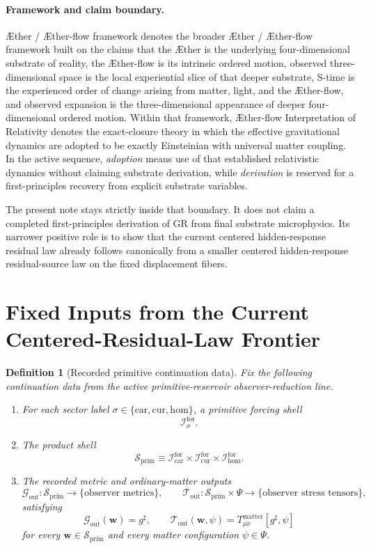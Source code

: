 \documentclass[11pt]{article}
\newcommand{\Aether}{\AE{}ther}
\newcommand{\Aflow}{\AE{}ther-flow}
\newcommand{\TheoryName}{\Aflow{} Interpretation of Relativity}
\newcommand{\TheoryProgram}{\Aether{} / \Aflow{} framework}
\newcommand{\CompletedMetric}{g^{\sharp}}
\newcommand{\MatterSpace}{\Psi}
\newcommand{\Car}{\mathrm{car}}
\newcommand{\Cur}{\mathrm{cur}}
\newcommand{\Hom}{\mathrm{hom}}
\newcommand{\ForSpace}[1]{\mathcal I_{#1}^{\mathrm{for}}}
\newcommand{\PrimShell}{\mathcal S_{\mathrm{prim}}}
\newcommand{\MetricOut}{\mathscr G_{\mathrm{out}}}
\newcommand{\MatterOut}{\mathscr T_{\mathrm{out}}}
\newtheorem{definition}{Definition}
\begin{document}
\paragraph{Framework and claim boundary.}
\TheoryProgram{} denotes the broader \Aether{} / \Aflow{} framework built on the claims that the \Aether{} is the underlying four-dimensional substrate of reality, the \Aflow{} is its intrinsic ordered motion, observed three-dimensional space is the local experiential slice of that deeper substrate, S-time is the experienced order of change arising from matter, light, and the \Aflow{}, and observed expansion is the three-dimensional appearance of deeper four-dimensional ordered motion. Within that framework, \TheoryName{} denotes the exact-closure theory in which the effective gravitational dynamics are adopted to be exactly Einsteinian with universal matter coupling. In the active sequence, \emph{adoption} means use of that established relativistic dynamics without claiming substrate derivation, while \emph{derivation} is reserved for a first-principles recovery from explicit substrate variables.

The present note stays strictly inside that boundary. It does not claim a completed first-principles derivation of GR from final substrate microphysics. Its narrower positive role is to show that the current centered hidden-response residual law already follows canonically from a smaller centered hidden-response residual-source law on the fixed displacement fibers.

\section{Fixed Inputs from the Current Centered-Residual-Law Frontier}

\begin{definition}[Recorded primitive continuation data]
\label{def:fixed}
Fix the following continuation data from the active primitive-reservoir observer-reduction line.
\begin{enumerate}
    \item For each sector label \(\sigma\in\{\Car,\Cur,\Hom\}\), a primitive forcing shell
    \[
    \ForSpace{\sigma}.
    \]
    \item The product shell
    \[
    \PrimShell
    \equiv
    \ForSpace{\Car}\times \ForSpace{\Cur}\times \ForSpace{\Hom}.
    \]
    \item The recorded metric and ordinary-matter outputs
    \[
    \MetricOut:\PrimShell\to\{\text{observer metrics}\},
    \qquad
    \MatterOut:\PrimShell\times\MatterSpace\to\{\text{observer stress tensors}\},
    \]
    satisfying
    \begin{equation}
    \MetricOut(\mathbf w)=\CompletedMetric,
    \qquad
    \MatterOut(\mathbf w,\psi)
    =
    T_{\mu\nu}^{\mathrm{matter}}[\CompletedMetric,\psi]
    \label{eq:fixedoutputs}
    \end{equation}
    for every \(\mathbf w\in\PrimShell\) and every matter configuration \(\psi\in\MatterSpace\).
\end{enumerate}
\end{definition}
\end{document}
